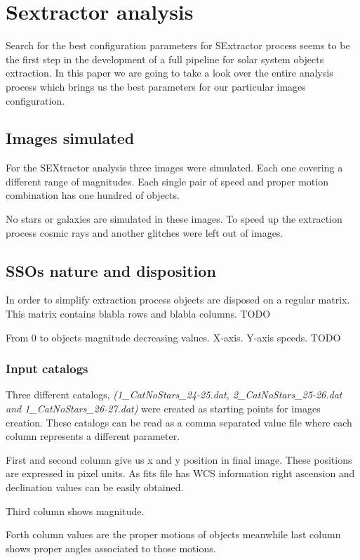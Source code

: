 \documentclass{article}
\begin{document}
\section{Sextractor analysis}
Search for the best configuration parameters for SExtractor process seems to be the first step in the development of a full pipeline for solar system objects extraction.
In this paper we are going to take a look over the entire analysis process which brings us the best parameters for our particular images configuration.

\subsection{Images simulated}
For the SEXtractor analysis three images were simulated. Each one covering a different range of magnitudes. Each single pair of speed and proper motion combination has one hundred of objects.
\par
No stars or galaxies are simulated in these images. To speed up the extraction process cosmic rays and another glitches were left out of images.

\subsection{SSOs nature and disposition}
In order to simplify extraction process objects are disposed on a regular matrix. 
This matrix contains blabla rows and blabla columns. TODO
\par
From 0 to objects magnitude decreasing values. X-axis.
Y-axis speeds. TODO

\subsubsection{Input catalogs}
Three different catalogs, \textit{(1\_CatNoStars\_24-25.dat, 2\_CatNoStars\_25-26.dat and 1\_CatNoStars\_26-27.dat)} were created as starting points for images creation. 
These catalogs can be read as a comma separated value file where each column represents a different parameter.
\par
First and second column give us x and y position in final image. These positions are expressed in pixel units. As fits file has WCS information right ascension and declination values can be easily obtained.
\par
Third column shows magnitude. 
\par
Forth column values are the proper motions of objects meanwhile last column shows proper angles associated to those motions.
\end{document}
